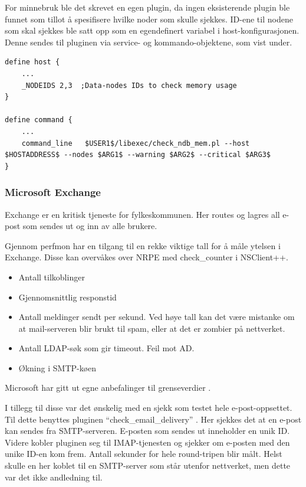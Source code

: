 For minnebruk ble det skrevet en egen plugin, da ingen eksisterende plugin ble funnet som tillot å spesifisere hvilke noder som skulle sjekkes. ID-ene til nodene som skal sjekkes ble satt opp som en egendefinert variabel i host-konfigurasjonen. Denne sendes til pluginen via service- og kommando-objektene, som vist under.

\begin{lstlisting}
define host {
	...
	_NODEIDS 2,3  ;Data-nodes IDs to check memory usage
}

define command {
	...
	command_line   $USER1$/libexec/check_ndb_mem.pl --host $HOSTADDRESS$ --nodes $ARG1$ --warning $ARG2$ --critical $ARG3$
}
\end{lstlisting}
\subsubsection{Microsoft Exchange}

Exchange er en kritisk tjeneste for fylkeskommunen. Her routes og lagres all e-post som sendes ut og inn av alle brukere. 

Gjennom perfmon har en tilgang til en rekke viktige tall \cite{exchange} for å måle ytelsen i Exchange. Disse kan overvåkes over NRPE med check\_counter i NSClient++.
\begin{itemize}
	\item Antall tilkoblinger
	\item Gjennomsnittlig responstid
	\item Antall meldinger sendt per sekund. Ved høye tall kan det være mistanke om at mail-serveren blir brukt til spam, eller at det er zombier på nettverket.
	\item Antall LDAP-søk som gir timeout. Feil mot AD.
	\item Økning i SMTP-køen
\end{itemize}

Microsoft har gitt ut egne anbefalinger til grenseverdier \cite{exchangethresholds}.

I tillegg til disse var det ønskelig med en sjekk som testet hele e-post-oppsettet. Til dette benyttes pluginen “check\_email\_delivery” . Her sjekkes det at en e-post kan sendes fra SMTP-serveren. E-posten som sendes ut inneholder en unik ID. Videre kobler pluginen seg til IMAP-tjenesten og sjekker om e-posten med den unike ID-en kom frem. Antall sekunder for hele round-tripen blir målt. Helst skulle en her koblet til en SMTP-server som står utenfor nettverket, men dette var det ikke andledning til.

